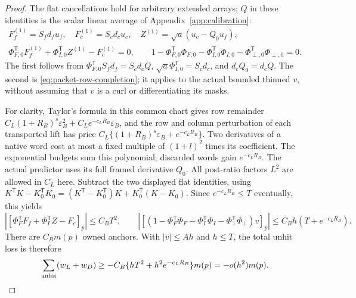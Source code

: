 \documentclass[11pt,reqno]{amsart}
\numberwithin{equation}{section}
\theoremstyle{definition}
\theoremstyle{remark}
\begin{document}
\begin{proof}
The flat cancellations hold for arbitrary extended arrays;
\(Q\) in these identities is the scalar linear average of
Appendix~\ref{app:calibration}:
\begin{gather*}
 F_f^{(1)}=S_fd_fu_f,\quad F_c^{(1)}=S_cd_cu_c,\quad
 Z^{(1)}=\sqrt a(u_c-Q_0u_f),\\
 \Phi_{F,0}^{\mathsf T}F_f^{(1)}+\Phi_{I,0}^{\mathsf T}Z^{(1)}-F_c^{(1)}=0,
 \qquad 1-\Phi_{F,0}^{\mathsf T}\Phi_{F,0}
             -\Phi_{I,0}^{\mathsf T}\Phi_{I,0}-\Phi_{\perp,0}^{\mathsf T}\Phi_{\perp,0}=0.
\end{gather*}
The first follows from
\(\Phi_{F,0}^{\mathsf T}S_fd_f=S_cd_cQ\),
\(\sqrt a\Phi_{I,0}^{\mathsf T}=S_cd_c\), and \(d_cQ_0=d_cQ\).
The second is \eqref{eq:packet-row-completion}; it applies
to the actual bounded thinned \(v\), without assuming that
\(v\) is a curl or differentiating its masks.

For clarity, Taylor's formula in this common chart gives row
remainder \(C_L(1+R_B)^s\varepsilon_B^2
+C_Le^{-c_LR_B}\varepsilon_B\), and the row and column
perturbation of each transported lift has price
\(C_L\{(1+R_B)^s\varepsilon_B+e^{-c_LR_B}\}\).
Two derivatives of a native word cost at most a fixed multiple
of \((1+l)^2\) times its coefficient. The exponential budgets
sum this polynomial; discarded words gain \(e^{-c_LR_B}\).
The actual predictor uses its full framed derivative \(Q_0\).
All post-ratio factors \(L^2\) are allowed in \(C_L\) here.
Subtract the two displayed flat identities, using
\(K^{\mathsf T}K-K_0^{\mathsf T}K_0=(K^{\mathsf T}-K_0^{\mathsf T})K+K_0^{\mathsf T}(K-K_0)\).
Since \(e^{-c_LR_B}\le T\) eventually, this yields
\[
 |[\Phi_F^{\mathsf T}F_f+\Phi_I^{\mathsf T}Z-F_c]_p|\le C_BT^2,
 \qquad
 |[(1-\Phi_F^{\mathsf T}\Phi_F-\Phi_I^{\mathsf T}\Phi_I-\Phi_\perp^{\mathsf T}\Phi_\perp)v]_p|
                                                \le C_Bh(T+e^{-c_LR_B}).
\]
There are \(C_Bm(p)\) owned anchors. With \(|v|\le Ah\)
and \(h\le T\), the total unhit loss is therefore
\begin{equation}
          \sum_{\rm unhit}(w_L+w_D)
             \ge-C_B\{hT^2+h^2e^{-c_LR_B}\}m(p)= -o(h^2)m(p).
 \label{eq:packet-unhit-budget}
\end{equation}


\end{proof}
\end{document}
